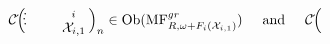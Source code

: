 \documentclass[10pt]{amsart}
\theoremstyle{break}
\begin{document}
$$
{{\mathcal{C}}}\acute{}\Big(
\unitlength 0.1in
\begin{picture}(6.250,1.7500)(2.00,-4.500)
\special{pn 8}\special{pn 8}\special{ar 370 400 100 100  0.0000000 0.1200000}\special{ar 370 400 100 100  0.4800000 0.6000000}\special{ar 370 400 100 100  0.9600000 1.0800000}\special{ar 370 400 100 100  1.4400000 1.5600000}\special{ar 370 400 100 100  1.9200000 2.0400000}\special{ar 370 400 100 100  2.4000000 2.5200000}\special{ar 370 400 100 100  2.8800000 3.0000000}\special{ar 370 400 100 100  3.3600000 3.4800000}\special{ar 370 400 100 100  3.8400000 3.9600000}\special{ar 370 400 100 100  4.3200000 4.4400000}\special{ar 370 400 100 100  4.8000000 4.9200000}\special{ar 370 400 100 100  5.2800000 5.4000000}\special{ar 370 400 100 100  5.7600000 5.8800000}\special{ar 370 400 100 100  6.2400000 6.2832853}\special{pn 8}\special{pa 470 400}\special{pa 502 359}\special{pa 530 324}\special{pa 553 301}\special{pa 567 296}\special{pa 570 313}\special{pa 566 348}\special{pa 566 385}\special{pa 578 408}\special{pa 605 414}\special{pa 642 407}\special{pa 670 400}\special{sp}\special{pn 8}\special{pa 670 400}\special{pa 680 400}\special{fp}\special{sh 1}\special{pa 680 400}\special{pa 613 380}\special{pa 627 400}\special{pa 613 420}\special{pa 680 400}\special{fp}\special{pn 8}\special{pa 670 400}\special{pa 670 400}\special{pa 670 400}\special{pa 670 400}\special{pa 670 400}\special{sp}\special{pn 8}\special{pa 370 300}\special{pa 330 250}\special{fp}\special{pa 270 350}\special{pa 200 280}\special{fp}\special{pa 280 450}\special{pa 200 490}\special{fp}\special{pa 370 500}\special{pa 340 550}\special{fp}\put(6.8000,-5.0000){\makebox(0,0){$\mathcal{X}_{i,1}$}}\put(6.8000,-3.50000){\makebox(0,0){${}_{i}$}}\put(2.000,-4.5000){\makebox(0,0){$\cdot$}}\put(1.9000,-4.000){\makebox(0,0){$\cdot$}}\put(2.000,-3.5000){\makebox(0,0){$\cdot$}}\end{picture}
\Big)_{n} \in {{\mathrm{Ob}}} ({{\mathrm{MF}}}^{gr}_{R,\omega + F_{i}(\mathcal{X}_{i,1})})
\hspace{0.5cm} {\rm and} \hspace{0.5cm} 
{{\mathcal{C}}}\acute{}\Big(
\unitlength 0.1in
\begin{picture}(6.25,1.7500)(2.0,-4.500)

\end{picture}$$
\end{document}
